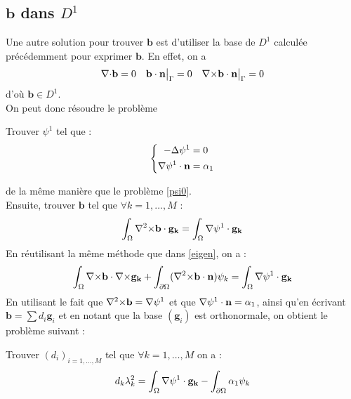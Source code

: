 \subsection{$\mathbf{b}$ dans $D^1$}
Une autre solution pour trouver $\mathbf{b}$ est d'utiliser la base de $D^1$ calculée précédemment pour exprimer $\mathbf{b}$. En effet, on a
\[ {\nabla\cdot}\mathbf{b}=0\quad \mathbf{b}\cdot\mathbf{n}{\big\rvert_{\Gamma}}=0\quad {\nabla\times}\mathbf{b}\cdot\mathbf{n}{\big\rvert_{\Gamma}}=0\]
d'où $\mathbf{b}\in D^1$.\\
On peut donc résoudre le problème
\begin{pb}
Trouver $\psi^1$ tel que :
\begin{equation*}
\left\{ \begin{aligned}
-{\Delta}\psi^1 &= 0\\
{\nabla}\psi^1\cdot\mathbf{n} &= \alpha_1
\end{aligned}\right. \end{equation*}\end{pb}
de la même manière que le problème \ref{psi0}.\\
Ensuite, trouver $\mathbf{b}$ tel que $\forall k=1,\dots,M$ :
\[ \int_\Omega {\nabla^2\times}\mathbf{b}\cdot\mathbf{g_k} = \int_\Omega {\nabla}\psi^1\cdot\mathbf{g_k} \]
En réutilisant la même méthode que dans \ref{eigen}, on a :
\[ \int_\Omega {\nabla\times}\mathbf{b}\cdot{\nabla\times}\mathbf{g_k} + \int_{\partial\Omega}({\nabla^2\times}\mathbf{b}\cdot\mathbf{n})\psi_k = \int_\Omega {\nabla}\psi^1\cdot\mathbf{g_k} \]
En utilisant le fait que ${\nabla^2\times}\mathbf{b}={\nabla}\psi^1$ et que ${\nabla}\psi^1\cdot\mathbf{n}=\alpha_1$, ainsi qu'en écrivant $\mathbf{b}=\sum d_i\mathbf{g}_i$ et en notant que la base $(\mathbf{g}_i)$ est orthonormale, on obtient le problème suivant :
\begin{pb}\label{pbbd1}
Trouver $(d_i)_{i=1,\dots,M}$ tel que $\forall k=1,\dots,M$ on a :
\[ d_k\lambda_k^2 = \int_\Omega {\nabla}\psi^1\cdot\mathbf{g_k} - \int_{\partial\Omega} \alpha_1\psi_k \]
\end{pb}


